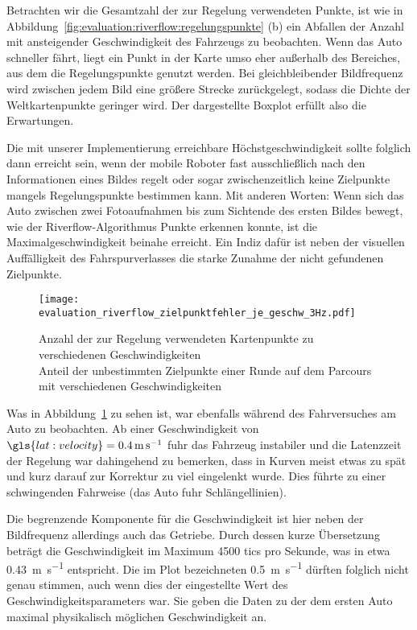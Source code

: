 Betrachten wir die Gesamtzahl der zur Regelung verwendeten Punkte, ist wie in Abbildung~\ref{fig:evaluation:riverflow:regelungspunkte} (b) ein Abfallen der Anzahl mit ansteigender Geschwindigkeit des Fahrzeugs zu beobachten. Wenn das Auto schneller fährt, liegt ein Punkt in der Karte umso eher außerhalb des Bereiches, aus dem die Regelungspunkte genutzt werden. Bei gleichbleibender Bildfrequenz wird zwischen jedem Bild eine größere Strecke zurückgelegt, sodass die Dichte der Weltkartenpunkte geringer wird. Der dargestellte Boxplot erfüllt also die Erwartungen.

Die mit unserer Implementierung erreichbare Höchstgeschwindigkeit sollte folglich dann erreicht sein, wenn der mobile Roboter fast ausschließlich nach den Informationen eines Bildes regelt oder sogar zwischenzeitlich keine Zielpunkte mangels Regelungspunkte bestimmen kann. Mit anderen Worten: Wenn sich das Auto zwischen zwei Fotoaufnahmen bis zum Sichtende des ersten Bildes bewegt, wie der Riverflow-Algorithmus Punkte erkennen konnte, ist die Maximalgeschwindigkeit beinahe erreicht. Ein Indiz dafür ist neben der visuellen Auffälligkeit des Fahrspurverlasses die starke Zunahme der nicht gefundenen Zielpunkte. 

\begin{figure}[h] %
	\centering
	\texttt{[image: evaluation\_riverflow\_zielpunktfehler\_je\_geschw\_3Hz.pdf]}
	\caption{Anzahl der zur Regelung verwendeten Kartenpunkte zu verschiedenen Geschwindigkeiten \\
	Anteil der unbestimmten Zielpunkte einer Runde auf dem Parcours mit verschiedenen Geschwindigkeiten}
	\label{fig:evaluation:riverflow:zielpunktfehler_je_geschw}
\end{figure}

Was in Abbildung~\ref{fig:evaluation:riverflow:zielpunktfehler_je_geschw} zu sehen ist, war ebenfalls während des Fahrversuches am Auto zu beobachten. Ab einer Geschwindigkeit von \( \gls{lat:velocity} = \SI{0,4}{\metre\per\second} \) fuhr das Fahrzeug instabiler und die Latenzzeit der Regelung war dahingehend zu bemerken, dass in Kurven meist etwas zu spät und kurz darauf zur Korrektur zu viel eingelenkt wurde. Dies führte zu einer schwingenden Fahrweise (das Auto fuhr \glqq Schlängellinien\grqq). 

Die begrenzende Komponente für die Geschwindigkeit ist hier neben der Bildfrequenz allerdings auch das Getriebe. Durch dessen kurze Übersetzung beträgt die Geschwindigkeit im Maximum 4500 tics pro Sekunde, was in etwa \SI{0,43}{\metre\per\second} entspricht. Die im Plot bezeichneten \SI{0,5}{\metre\per\second} dürften folglich nicht genau stimmen, auch wenn dies der eingestellte Wert des Geschwindigkeitsparameters war. Sie geben die Daten zu der dem ersten Auto maximal physikalisch möglichen Geschwindigkeit an. 

